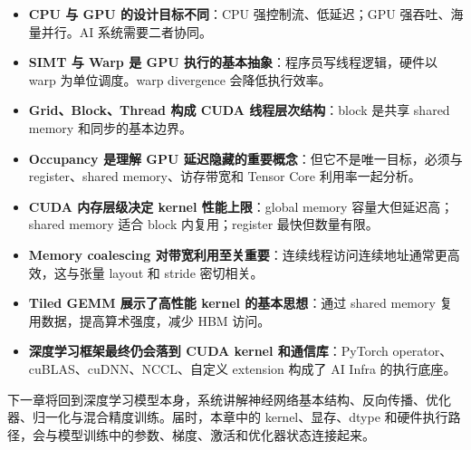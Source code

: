 \begin{itemize}
  \item \textbf{CPU 与 GPU 的设计目标不同}：CPU 强控制流、低延迟；GPU 强吞吐、海量并行。AI 系统需要二者协同。
  \item \textbf{SIMT 与 Warp 是 GPU 执行的基本抽象}：程序员写线程逻辑，硬件以 warp 为单位调度。warp divergence 会降低执行效率。
  \item \textbf{Grid、Block、Thread 构成 CUDA 线程层次结构}：block 是共享 shared memory 和同步的基本边界。
  \item \textbf{Occupancy 是理解 GPU 延迟隐藏的重要概念}：但它不是唯一目标，必须与 register、shared memory、访存带宽和 Tensor Core 利用率一起分析。
  \item \textbf{CUDA 内存层级决定 kernel 性能上限}：global memory 容量大但延迟高；shared memory 适合 block 内复用；register 最快但数量有限。
  \item \textbf{Memory coalescing 对带宽利用至关重要}：连续线程访问连续地址通常更高效，这与张量 layout 和 stride 密切相关。
  \item \textbf{Tiled GEMM 展示了高性能 kernel 的基本思想}：通过 shared memory 复用数据，提高算术强度，减少 HBM 访问。
  \item \textbf{深度学习框架最终仍会落到 CUDA kernel 和通信库}：PyTorch operator、cuBLAS、cuDNN、NCCL、自定义 extension 构成了 AI Infra 的执行底座。
\end{itemize}

下一章将回到深度学习模型本身，系统讲解神经网络基本结构、反向传播、优化器、归一化与混合精度训练。届时，本章中的 kernel、显存、dtype 和硬件执行路径，会与模型训练中的参数、梯度、激活和优化器状态连接起来。